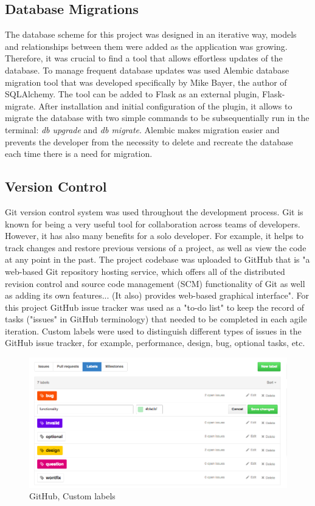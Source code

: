 \subsection{Database Migrations}
The database scheme for this project was designed in an iterative way, models and relationships between them were added as the application was growing. Therefore, it was crucial to find a tool that allows effortless updates of the database. To manage frequent database updates was used Alembic database migration tool that was developed specifically by Mike Bayer, the author of SQLAlchemy. The tool can be added to Flask as an external plugin, Flask-migrate. After installation and initial configuration of the plugin, it allows to migrate the database with two simple commands to be subsequentially run in the terminal: \emph{db upgrade} and \emph{db migrate}. Alembic makes migration easier and prevents the developer from the necessity to delete and recreate the database each time there is a need for migration.

\subsection{Version Control}
Git version control system was used throughout the development process. Git is known for being a very useful tool for collaboration across teams of developers. However, it has also many benefits for a solo developer. For example, it helps to track changes and restore previous versions of a project, as well as view the code at any point in the past. The project codebase was uploaded to GitHub that is \citet{wiki:GitHub} "a web-based Git repository hosting service, which offers all of the distributed revision control and source code management (SCM) functionality of Git as well as adding its own features... (It also) provides web-based graphical interface". For this project GitHub issue tracker was used as a "to-do list" to keep the record of tasks ("issues" in GitHub terminology) that needed to be completed in each agile iteration. Custom labels were used to distinguish different types of issues in the GitHub issue tracker, for example, performance, design, bug, optional tasks, etc. 

\begin{figure}[H]
	\begin{center}
		\includegraphics[width=.90\linewidth,natwidth=610,natheight=642]{impl/images/githubLabelsChoice}
		\caption{GitHub, Custom labels} \label{fig:using:githubLabelsChoice}
	\end{center}
\end{figure}


